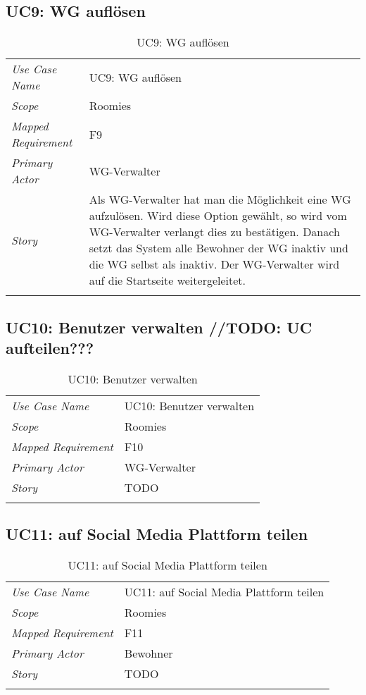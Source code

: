 \subsection{UC9: WG auflösen}
\begin{table}[H]
	\tablestyle
	\tablealtcolored
	\begin{tabularx}{\textwidth}{lX}
		\tablebody
			\textit{Use Case Name} &
			UC9: WG auflösen
			\tabularnewline
			\textit{Scope} &
			Roomies
			\tabularnewline
			\textit{Mapped Requirement} &
			F9
			\tabularnewline
			\textit{Primary Actor} &
			WG-Verwalter
			\tabularnewline
			\textit{Story} &
			Als WG-Verwalter hat man die Möglichkeit eine WG aufzulösen. Wird diese Option gewählt, so wird vom WG-Verwalter verlangt dies zu bestätigen. Danach setzt das System alle Bewohner der WG inaktiv und die WG selbst als inaktiv. Der WG-Verwalter wird auf die Startseite weitergeleitet.
			\tabularnewline
		\tableend
	\end{tabularx}
	\caption{UC9: WG auflösen}
\end{table}


\subsection{UC10: Benutzer verwalten //TODO: UC aufteilen???}
\begin{table}[H]
	\tablestyle
	\tablealtcolored
	\begin{tabularx}{\textwidth}{lX}
		\tablebody
			\textit{Use Case Name} &
			UC10: Benutzer verwalten
			\tabularnewline
			\textit{Scope} &
			Roomies
			\tabularnewline
			\textit{Mapped Requirement} &
			F10
			\tabularnewline
			\textit{Primary Actor} &
			WG-Verwalter
			\tabularnewline
			\textit{Story} &
			TODO
			\tabularnewline
		\tableend
	\end{tabularx}
	\caption{UC10: Benutzer verwalten}
\end{table}


\subsection{UC11: auf Social Media Plattform teilen}
\begin{table}[H]
	\tablestyle
	\tablealtcolored
	\begin{tabularx}{\textwidth}{lX}
		\tablebody
			\textit{Use Case Name} &
			UC11: auf Social Media Plattform teilen
			\tabularnewline
			\textit{Scope} &
			Roomies
			\tabularnewline
			\textit{Mapped Requirement} &
			F11
			\tabularnewline
			\textit{Primary Actor} &
			Bewohner
			\tabularnewline
			\textit{Story} &
			TODO
			\tabularnewline
		\tableend
	\end{tabularx}
	\caption{UC11: auf Social Media Plattform teilen}
\end{table}
